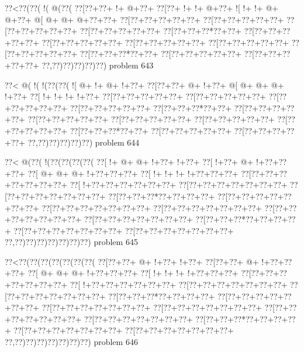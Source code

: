 \vbox{\vbox{\goo
\0??<\0??(\0??(\- !(\- @(\0??(
\0??[\0??+\0??+\- !+\- @+\0??+
\0??[\0??+\- !+\- !+\- @+\0??+
\- ![\- !+\- !+\- @+\- @+\0??+
\- @[\- @+\- @+\- @+\0??+\0??+
\0??[\0??+\0??+\0??+\0??+\0??+
\0??[\0??+\0??+\0??+\0??+\0??+
\0??[\0??+\0??+\0??+\0??+\0??+
\0??[\0??+\0??+\0??+\0??+\0??+
\0??[\0??+\0??+\0??*\0??+\0??+
\0??[\0??+\0??+\0??+\0??+\0??+
\0??[\0??+\0??+\0??+\0??+\0??+
\0??[\0??+\0??+\0??+\0??+\0??+
\0??[\0??+\0??+\0??+\0??+\0??+
\0??[\0??+\0??+\0??+\0??+\0??+
\0??[\0??+\0??+\0??*\0??+\0??+
\0??[\0??+\0??+\0??+\0??+\0??+
\0??[\0??+\0??+\0??+\0??+\0??+
\0??,\0??)\0??)\0??)\0??)\0??)
}
\hfil problem 643\hfil\break
}

\vbox{\vbox{\goo
\0??<\- @(\- !(\- !(\0??(\0??(
\- ![\- @+\- !+\- @+\- !+\0??+
\0??[\0??+\0??+\- @+\- !+\0??+
\- @[\- @+\- @+\- @+\- !+\0??+
\0??[\- !+\- !+\- !+\- !+\0??+
\0??[\0??+\0??+\0??+\0??+\0??+
\0??[\0??+\0??+\0??+\0??+\0??+
\0??[\0??+\0??+\0??+\0??+\0??+
\0??[\0??+\0??+\0??+\0??+\0??+
\0??[\0??+\0??+\0??*\0??+\0??+
\0??[\0??+\0??+\0??+\0??+\0??+
\0??[\0??+\0??+\0??+\0??+\0??+
\0??[\0??+\0??+\0??+\0??+\0??+
\0??[\0??+\0??+\0??+\0??+\0??+
\0??[\0??+\0??+\0??+\0??+\0??+
\0??[\0??+\0??+\0??*\0??+\0??+
\0??[\0??+\0??+\0??+\0??+\0??+
\0??[\0??+\0??+\0??+\0??+\0??+
\0??,\0??)\0??)\0??)\0??)\0??)
}
\hfil problem 644\hfil\break
}

\vbox{\vbox{\goo
\0??<\- @(\0??(\- !(\0??(\0??(\0??(\0??(
\0??[\- !+\- @+\- @+\- !+\0??+\- !+\0??+
\0??[\- !+\0??+\- @+\- !+\0??+\0??+\0??+
\0??[\- @+\- @+\- @+\- !+\0??+\0??+\0??+
\0??[\- !+\- !+\- !+\- !+\0??+\0??+\0??+
\0??[\0??+\0??+\0??+\0??+\0??+\0??+\0??+
\0??[\- !+\0??+\0??+\0??+\0??+\0??+\0??+
\0??[\0??+\0??+\0??+\0??+\0??+\0??+\0??+
\0??[\0??+\0??+\0??+\0??+\0??+\0??+\0??+
\0??[\0??+\0??+\0??*\0??+\0??+\0??+\0??+
\0??[\0??+\0??+\0??+\0??+\0??+\0??+\0??+
\0??[\0??+\0??+\0??+\0??+\0??+\0??+\0??+
\0??[\0??+\0??+\0??+\0??+\0??+\0??+\0??+
\0??[\0??+\0??+\0??+\0??+\0??+\0??+\0??+
\0??[\0??+\0??+\0??+\0??+\0??+\0??+\0??+
\0??[\0??+\0??+\0??*\0??+\0??+\0??+\0??+
\0??[\0??+\0??+\0??+\0??+\0??+\0??+\0??+
\0??[\0??+\0??+\0??+\0??+\0??+\0??+\0??+
\0??,\0??)\0??)\0??)\0??)\0??)\0??)\0??)
}
\hfil problem 645\hfil\break
}

\vbox{\vbox{\goo
\0??<\0??(\0??(\0??(\0??(\0??(\0??(\0??(
\0??[\0??+\0??+\- @+\- !+\0??+\- !+\0??+
\0??[\0??+\0??+\- @+\- !+\0??+\0??+\0??+
\0??[\- @+\- @+\- @+\- !+\0??+\0??+\0??+
\0??[\- !+\- !+\- !+\- !+\0??+\0??+\0??+
\0??[\0??+\0??+\0??+\0??+\0??+\0??+\0??+
\0??[\- !+\0??+\0??+\0??+\0??+\0??+\0??+
\0??[\0??+\0??+\0??+\0??+\0??+\0??+\0??+
\0??[\0??+\0??+\0??+\0??+\0??+\0??+\0??+
\0??[\0??+\0??+\0??*\0??+\0??+\0??+\0??+
\0??[\0??+\0??+\0??+\0??+\0??+\0??+\0??+
\0??[\0??+\0??+\0??+\0??+\0??+\0??+\0??+
\0??[\0??+\0??+\0??+\0??+\0??+\0??+\0??+
\0??[\0??+\0??+\0??+\0??+\0??+\0??+\0??+
\0??[\0??+\0??+\0??+\0??+\0??+\0??+\0??+
\0??[\0??+\0??+\0??*\0??+\0??+\0??+\0??+
\0??[\0??+\0??+\0??+\0??+\0??+\0??+\0??+
\0??[\0??+\0??+\0??+\0??+\0??+\0??+\0??+
\0??,\0??)\0??)\0??)\0??)\0??)\0??)\0??)
}
\hfil problem 646\hfil\break
}


